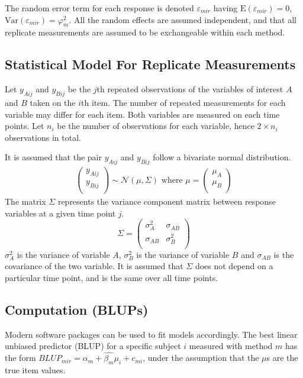 \documentclass[12pt, a4paper]{report}
\theoremstyle{plain}
\theoremstyle{definition}
\theoremstyle{remark}
\begin{document}
The random error term for each response is denoted $\varepsilon_{mir}$ having $\mathrm{E}(\varepsilon_{mir})=0$, $\mathrm{Var}(\varepsilon_{mir})=\varphi^2_m$. All the random effects are assumed independent, and that all replicate measurements are assumed to be exchangeable within each method.
\newpage

\subsection{Statistical Model For Replicate Measurements}
Let $y_{Aij}$ and $y_{Bij}$ be the $j$th repeated observations of the variables of interest $A$ and $B$ taken on the $i$th item. The number of repeated measurements for each variable may differ for each item.
Both variables are measured on each time points. Let $n_{i}$ be the number of observations for each variable, hence $2\times n_{i}$ observations in total.

It is assumed that the pair $y_{Aij}$ and $y_{Bij}$ follow a bivariate normal distribution.
\begin{eqnarray}
\left(
\begin{array}{c}
y_{Aij} \\
y_{Bij} \\
\end{array}
\right) \sim \mathcal{N}(
{\mu}, {\Sigma})\mbox{   where } {\mu} = \left(
\begin{array}{c}
\mu_{A} \\
\mu_{B} \\
\end{array}
\right)
\end{eqnarray}
The matrix ${\Sigma}$ represents the variance component matrix between response variables at a given time point $j$.
\begin{equation}
{\Sigma} = \left( \begin{array}{cc}
\sigma^2_{A} & \sigma_{AB} \\
\sigma_{AB} & \sigma^2_{B}\\
\end{array}\right)
\end{equation}
$\sigma^2_{A}$ is the variance of variable $A$, $\sigma^2_{B}$ is the variance of variable $B$ and $\sigma_{AB}$ is the covariance of the two variable. It is assumed that ${\Sigma}$ does not depend on a particular time point, and is the same over all time points.

\newpage
\subsection{Computation (BLUPs)} 
Modern software packages can be used to fit models accordingly. The best linear unbiased predictor (BLUP) for a specific subject $i$ measured with method $m$ has the form $BLUP_{mir} = \hat{\alpha_{m}} + \hat{\beta_{m}}\mu_{i} + c_{mi}$, under the assumption that the $\mu$s are the true item values.
\end{document}

